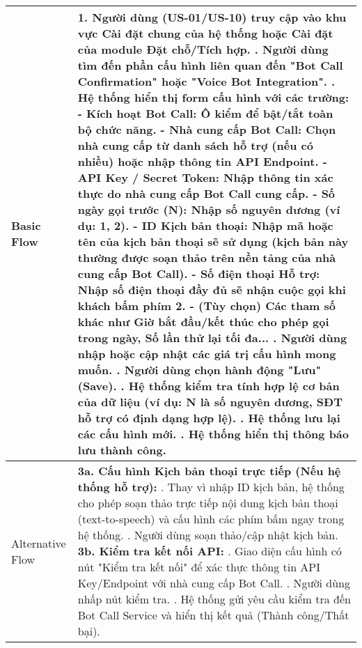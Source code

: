 \begin{longtable}{|m{4cm}|p{11cm}|}
Basic Flow & 1. Người dùng (US-01/US-10) truy cập vào khu vực Cài đặt chung của hệ thống hoặc Cài đặt của module Đặt chỗ/Tích hợp. \newline 2. Người dùng tìm đến phần cấu hình liên quan đến "Bot Call Confirmation" hoặc "Voice Bot Integration". \newline 3. Hệ thống hiển thị form cấu hình với các trường: \newline    - \textbf{Kích hoạt Bot Call:} Ô kiểm để bật/tắt toàn bộ chức năng. \newline    - \textbf{Nhà cung cấp Bot Call:} Chọn nhà cung cấp từ danh sách hỗ trợ (nếu có nhiều) hoặc nhập thông tin API Endpoint. \newline    - \textbf{API Key / Secret Token:} Nhập thông tin xác thực do nhà cung cấp Bot Call cung cấp. \newline    - \textbf{Số ngày gọi trước (N):} Nhập số nguyên dương (ví dụ: 1, 2). \newline    - \textbf{ID Kịch bản thoại:} Nhập mã hoặc tên của kịch bản thoại sẽ sử dụng (kịch bản này thường được soạn thảo trên nền tảng của nhà cung cấp Bot Call). \newline    - \textbf{Số điện thoại Hỗ trợ:} Nhập số điện thoại đầy đủ sẽ nhận cuộc gọi khi khách bấm phím 2. \newline    - (Tùy chọn) Các tham số khác như Giờ bắt đầu/kết thúc cho phép gọi trong ngày, Số lần thử lại tối đa... \newline 4. Người dùng nhập hoặc cập nhật các giá trị cấu hình mong muốn. \newline 5. Người dùng chọn hành động "Lưu" (Save). \newline 6. Hệ thống kiểm tra tính hợp lệ cơ bản của dữ liệu (ví dụ: N là số nguyên dương, SĐT hỗ trợ có định dạng hợp lệ). \newline 7. Hệ thống lưu lại các cấu hình mới. \newline 8. Hệ thống hiển thị thông báo lưu thành công. \\
\hline
Alternative Flow & \textbf{3a. Cấu hình Kịch bản thoại trực tiếp (Nếu hệ thống hỗ trợ):} \newline    1. Thay vì nhập ID kịch bản, hệ thống cho phép soạn thảo trực tiếp nội dung kịch bản thoại (text-to-speech) và cấu hình các phím bấm ngay trong hệ thống. \newline    2. Người dùng soạn thảo/cập nhật kịch bản. \newline \textbf{3b. Kiểm tra kết nối API:} \newline    1. Giao diện cấu hình có nút "Kiểm tra kết nối" để xác thực thông tin API Key/Endpoint với nhà cung cấp Bot Call. \newline    2. Người dùng nhấp nút kiểm tra. \newline    3. Hệ thống gửi yêu cầu kiểm tra đến Bot Call Service và hiển thị kết quả (Thành công/Thất bại). \\

\end{longtable}
